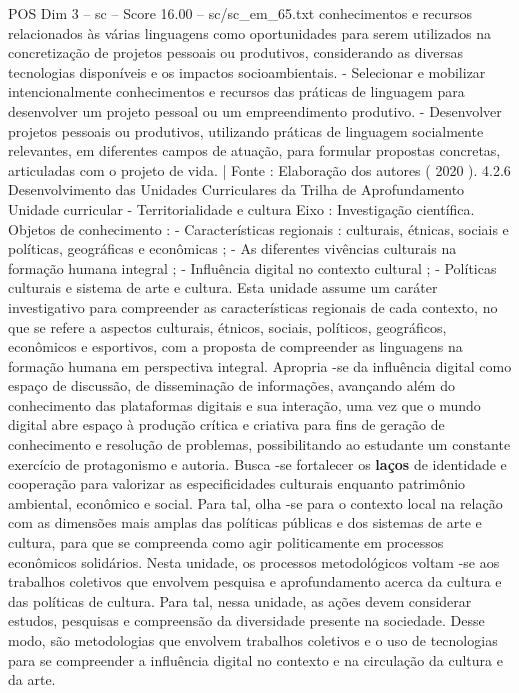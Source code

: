 \begin{textsample}{POS Dim 3 – sc – Score 16.00 – sc/sc\_em\_65.txt}
conhecimentos e recursos relacionados às várias linguagens como oportunidades para serem utilizados na concretização de projetos pessoais ou produtivos, considerando as diversas tecnologias disponíveis e os impactos socioambientais. - Selecionar e mobilizar intencionalmente conhecimentos e recursos das práticas de linguagem para desenvolver um projeto pessoal ou um empreendimento produtivo. - Desenvolver projetos pessoais ou produtivos, utilizando práticas de linguagem socialmente relevantes, em diferentes campos de atuação, para formular propostas concretas, articuladas com o projeto de vida. | Fonte : Elaboração dos autores ( 2020 ). 4.2.6 Desenvolvimento das Unidades Curriculares da Trilha de Aprofundamento Unidade curricular - Territorialidade e cultura Eixo : Investigação científica.
Objetos de conhecimento : - Características regionais : culturais, étnicas, sociais e políticas, geográficas e econômicas ; - As diferentes vivências culturais na formação humana integral ; - Influência digital no contexto cultural ; - Políticas culturais e sistema de arte e cultura.
Esta unidade assume um caráter investigativo para compreender as características regionais de cada contexto, no que se refere a aspectos culturais, étnicos, sociais, políticos, geográficos, econômicos e esportivos, com a proposta de compreender as linguagens na formação humana em perspectiva integral.
Apropria -se da influência digital como espaço de discussão, de disseminação de informações, avançando além do conhecimento das plataformas digitais e sua interação, uma vez que o mundo digital abre espaço à produção crítica e criativa para fins de geração de conhecimento e resolução de problemas, possibilitando ao estudante um constante exercício de protagonismo e autoria.
Busca -se fortalecer os \textbf{laços} de identidade e cooperação para valorizar as especificidades culturais enquanto patrimônio ambiental, econômico e social.
Para tal, olha -se para o contexto local na relação com as dimensões mais amplas das políticas públicas e dos sistemas de arte e cultura, para que se compreenda como agir politicamente em processos econômicos solidários.
Nesta unidade, os processos metodológicos voltam -se aos trabalhos coletivos que envolvem pesquisa e aprofundamento acerca da cultura e das políticas de cultura.
Para tal, nessa unidade, as ações devem considerar estudos, pesquisas e compreensão da diversidade presente na sociedade.
Desse modo, são metodologias que envolvem trabalhos coletivos e o uso de tecnologias para se compreender a influência digital no contexto e na circulação da cultura e da arte.

\end{textsample}
